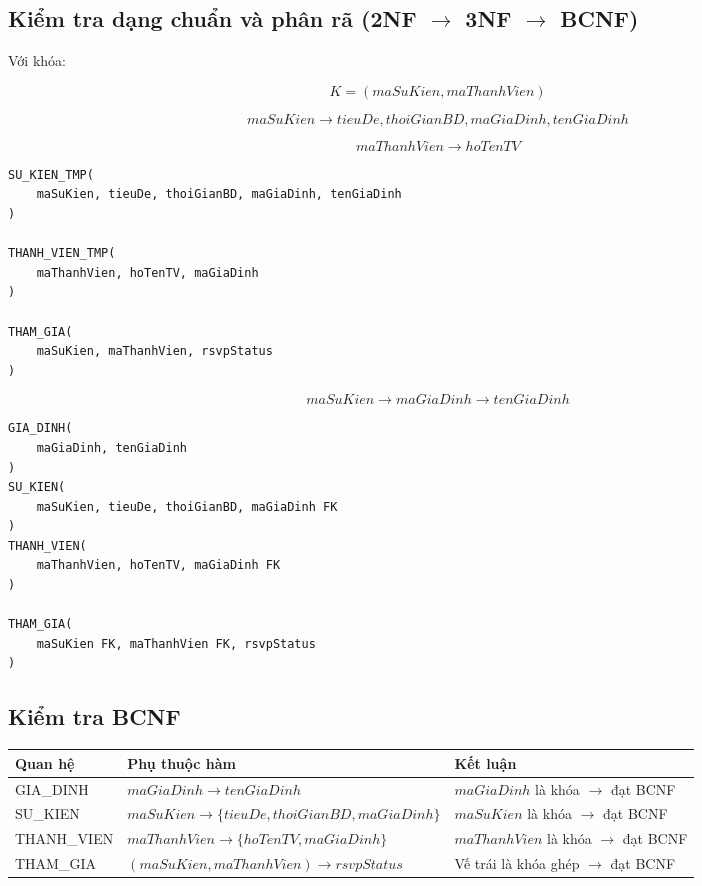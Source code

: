 \subsection{Kiểm tra dạng chuẩn và phân rã (2NF $\rightarrow$ 3NF $\rightarrow$ BCNF)}

Với khóa:

\[
K=(maSuKien,maThanhVien)
\]

\[
maSuKien \rightarrow tieuDe,thoiGianBD,maGiaDinh,tenGiaDinh
\]


\[
maThanhVien \rightarrow hoTenTV
\]

\begin{infobox}
\begin{verbatim}
SU_KIEN_TMP(
    maSuKien, tieuDe, thoiGianBD, maGiaDinh, tenGiaDinh
)

THANH_VIEN_TMP(
    maThanhVien, hoTenTV, maGiaDinh
)

THAM_GIA(
    maSuKien, maThanhVien, rsvpStatus
)
\end{verbatim}
\end{infobox}
\[
maSuKien \rightarrow maGiaDinh \rightarrow tenGiaDinh
\]
\begin{infobox}
\begin{verbatim}
GIA_DINH(
    maGiaDinh, tenGiaDinh
)
SU_KIEN(
    maSuKien, tieuDe, thoiGianBD, maGiaDinh FK
)
THANH_VIEN(
    maThanhVien, hoTenTV, maGiaDinh FK
)

THAM_GIA(
    maSuKien FK, maThanhVien FK, rsvpStatus
)
\end{verbatim}
\end{infobox}

\subsection{Kiểm tra BCNF}

\begin{center}
\begin{tabularx}{\linewidth}{@{}l>{\raggedright\arraybackslash}X>{\raggedright\arraybackslash}X@{}}
\toprule
\textbf{Quan hệ} & \textbf{Phụ thuộc hàm} & \textbf{Kết luận} \\
\midrule
GIA\_DINH &
$maGiaDinh \rightarrow tenGiaDinh$ &
$maGiaDinh$ là khóa $\rightarrow$ đạt BCNF \\

SU\_KIEN &
$maSuKien \rightarrow \{tieuDe,thoiGianBD,maGiaDinh\}$ &
$maSuKien$ là khóa $\rightarrow$ đạt BCNF \\

THANH\_VIEN &
$maThanhVien \rightarrow \{hoTenTV,maGiaDinh\}$ &
$maThanhVien$ là khóa $\rightarrow$ đạt BCNF \\

THAM\_GIA &
$(maSuKien,maThanhVien)\rightarrow rsvpStatus$ &
Vế trái là khóa ghép $\rightarrow$ đạt BCNF \\
\bottomrule
\end{tabularx}
\end{center}

